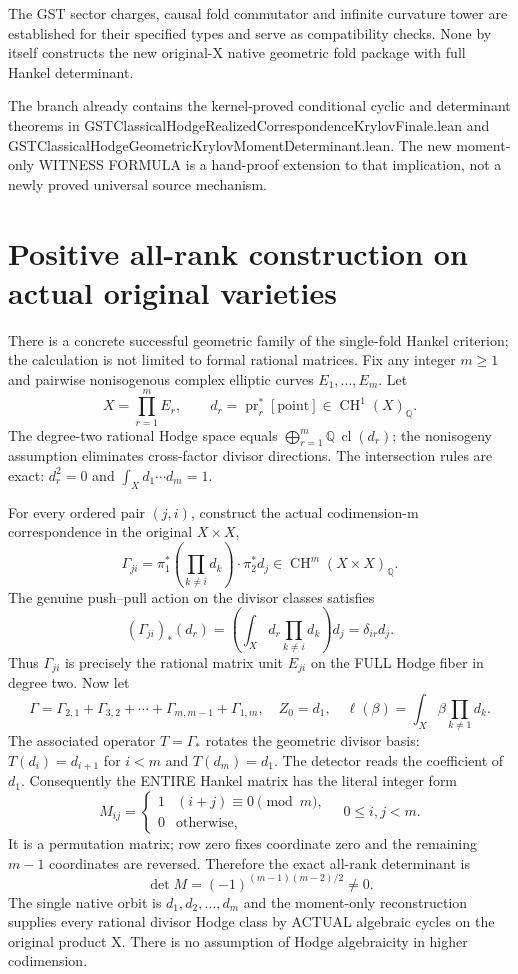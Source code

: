 \documentclass[11pt]{article}
\newcommand{\Q}{\mathbb Q}
\newcommand{\CH}{\operatorname{CH}}
\newcommand{\cl}{\operatorname{cl}}
\begin{document}
The GST sector charges, causal fold commutator and infinite curvature
tower are established for their specified types and serve as
compatibility checks. None by itself constructs the new original-X
native geometric fold package with full Hankel determinant.

The branch already contains the kernel-proved conditional
cyclic and determinant theorems in
GSTClassicalHodgeRealizedCorrespondenceKrylovFinale.lean and
GSTClassicalHodgeGeometricKrylovMomentDeterminant.lean.
The new moment-only WITNESS FORMULA is a hand-proof extension
to that implication, not a newly proved universal source mechanism.


\section{Positive all-rank construction on actual original varieties}
There is a concrete successful geometric family of the single-fold
Hankel criterion; the calculation is not limited to formal rational
matrices. Fix any integer \(m\ge1\) and pairwise nonisogenous complex
elliptic curves \(E_1,\ldots,E_m\). Let
\[
 X=\prod_{r=1}^{m}E_r,\qquad
 d_r=\operatorname{pr}_r^*[\mathrm{point}]\in\CH^1(X)_\Q.
\]
The degree-two rational Hodge space equals
\(\bigoplus_{r=1}^m\Q\,\cl(d_r)\); the nonisogeny assumption
eliminates cross-factor divisor directions. The intersection rules
are exact: \(d_r^2=0\) and \(\int_Xd_1\cdots d_m=1\).

For every ordered pair \((j,i)\), construct the actual codimension-m
correspondence in the original \(X\times X\),
\[
 \Gamma_{ji}
 =\pi_1^*\!\left(\prod_{k\ne i}d_k\right)
    \cdot\pi_2^*d_j\in\CH^m(X\times X)_\Q.
\]
The genuine push--pull action on the divisor classes satisfies
\[
(\Gamma_{ji})_*(d_r)
=\left(\int_Xd_r\prod_{k\ne i}d_k\right)d_j
=\delta_{ir}d_j.
\]
Thus \(\Gamma_{ji}\) is precisely the rational matrix unit
\(E_{ji}\) on the FULL Hodge fiber in degree two. Now let
\[
\Gamma=\Gamma_{2,1}+\Gamma_{3,2}+\cdots+
\Gamma_{m,m-1}+\Gamma_{1,m},\quad
Z_0=d_1,\quad
\ell(\beta)=\int_X\beta\prod_{k\ne1}d_k.
\]
The associated operator \(T=\Gamma_*\) rotates the geometric
divisor basis: \(T(d_i)=d_{i+1}\) for \(i<m\) and
\(T(d_m)=d_1\). The detector reads the coefficient of \(d_1\).
Consequently the ENTIRE Hankel matrix has the literal integer form
\[
M_{ij}=\begin{cases}1&(i+j)\equiv0\pmod m,\\0&\text{otherwise},
\end{cases}
\quad 0\le i,j<m.
\]
It is a permutation matrix; row zero fixes coordinate zero and
the remaining \(m-1\) coordinates are reversed. Therefore the exact
all-rank determinant is
\[
\boxed{\det M=(-1)^{(m-1)(m-2)/2}\ne0.}
\]
The single native orbit is \(d_1,d_2,\ldots,d_m\) and the
moment-only reconstruction supplies every rational divisor
Hodge class by ACTUAL algebraic cycles on the original product X.
There is no assumption of Hodge algebraicity in higher codimension.
\end{document}
